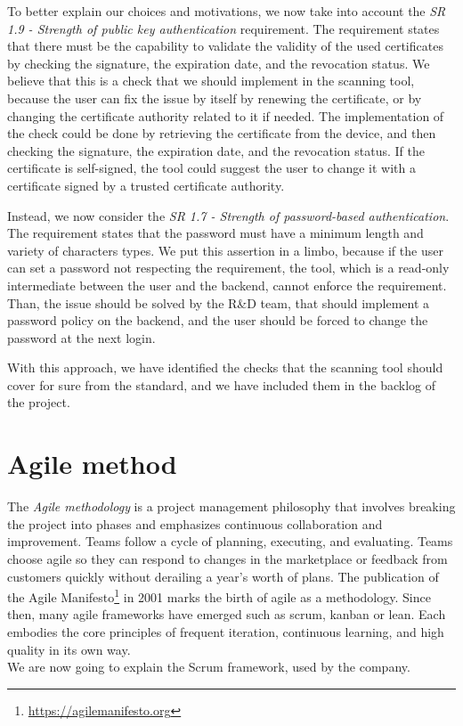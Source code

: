 To better explain our choices and motivations, we now take into account the \textit{SR 1.9 - Strength of public key authentication} requirement. The requirement states that there must be the capability to validate the validity of the used certificates by checking the signature, the expiration date, and the revocation status. We believe that this is a check that we should implement in the scanning tool, because the user can fix the issue by itself by renewing the certificate, or by changing the certificate authority related to it if needed. The implementation of the check could be done by retrieving the certificate from the device, and then checking the signature, the expiration date, and the revocation status. If the certificate is self-signed, the tool could suggest the user to change it with a certificate signed by a trusted certificate authority.

Instead, we now consider the \textit{SR 1.7 - Strength of password-based authentication}. The requirement states that the password must have a minimum length and variety of characters types. We put this assertion in a limbo, because if the user can set a password not respecting the requirement, the tool, which is a read-only intermediate between the user and the backend, cannot enforce the requirement. Than, the issue should be solved by the R\&D team, that should implement a password policy on the backend, and the user should be forced to change the password at the next login.

With this approach, we have identified the checks that the scanning tool should cover for sure from the standard, and we have included them in the backlog of the project.

\section{Agile method}

The \textit{Agile methodology} is a project management philosophy that involves breaking the project into phases and emphasizes continuous collaboration and improvement. Teams follow a cycle of planning, executing, and evaluating. Teams choose agile so they can respond to changes in the marketplace or feedback from customers quickly without derailing a year's worth of plans. The publication of the Agile Manifesto\footnote{\url{https://agilemanifesto.org}} in 2001 marks the birth of agile as a methodology. Since then, many agile frameworks have emerged such as scrum, kanban or lean. Each embodies the core principles of frequent iteration, continuous learning, and high quality in its own way.~\cite{agile-methodology} \\
We are now going to explain the Scrum framework, used by the company.

